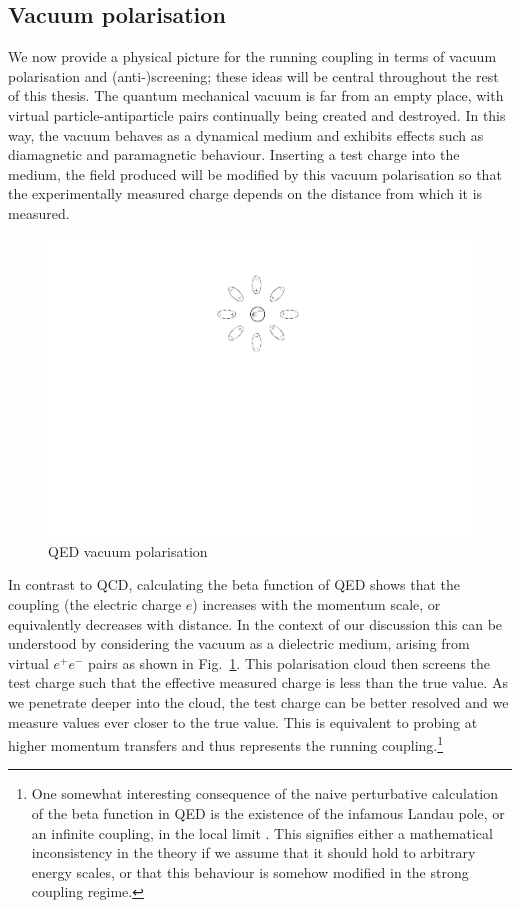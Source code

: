 \documentclass[11pt, a4paper, twoside]{book}
\begin{document}
\subsection{Vacuum polarisation}
\label{sec:VacPol}
We now provide a physical picture for the running coupling in terms of vacuum polarisation and (anti-)screening; these ideas will be central throughout the rest of this thesis. The quantum mechanical vacuum is far from an empty place, with virtual particle-antiparticle pairs continually being created and destroyed. In this way, the vacuum behaves as a dynamical medium and exhibits effects such as diamagnetic and paramagnetic behaviour. Inserting a test charge into the medium, the field produced will be modified by this vacuum polarisation so that the experimentally measured charge depends on the distance from which it is measured.
\begin{figure}[t]
	\centering
	\includegraphics{QEDVacPol}
	\caption{QED vacuum polarisation}
	\label{fig:QEDVacPol}
\end{figure}
In contrast to QCD, calculating the beta function of QED shows that the coupling (the electric charge \(e\)) increases with the momentum scale, or equivalently decreases with distance. In the context of our discussion this can be understood by considering the vacuum as a dielectric medium, arising from virtual \(e^+e^-\) pairs as shown in Fig.~\ref{fig:QEDVacPol}. This polarisation cloud then screens the test charge such that the effective measured charge is less than the true value. As we penetrate deeper into the cloud, the test charge can be better resolved and we measure values ever closer to the true value. This is equivalent to probing at higher momentum transfers and thus represents the running coupling.\footnote{One somewhat interesting consequence of the naive perturbative calculation of the beta function in QED is the existence of the infamous Landau pole, or an infinite coupling, in the local limit \cite{Peskin:1995ev}. This signifies either a mathematical inconsistency in the theory if we assume that it should hold to arbitrary energy scales, or that this behaviour is somehow modified in the strong coupling regime.}
\end{document}
